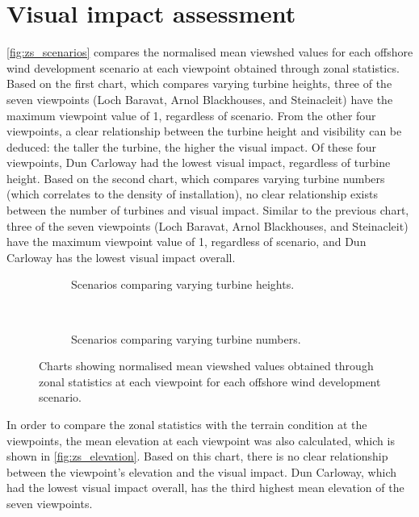 \section{Visual impact assessment}

\autoref{fig:zs_scenarios} compares the normalised mean viewshed values for
each offshore wind development scenario at each viewpoint obtained through
zonal statistics. Based on the first chart, which compares varying turbine
heights, three of the seven viewpoints (Loch Baravat, Arnol Blackhouses, and
Steinacleit) have the maximum viewpoint value of 1, regardless of scenario.
From the other four viewpoints, a clear relationship between the turbine height
and visibility can be deduced: the taller the turbine, the higher the visual
impact. Of these four viewpoints, Dun Carloway had the lowest visual impact,
regardless of turbine height. Based on the second chart, which compares varying
turbine numbers (which correlates to the density of installation), no clear
relationship exists between the number of turbines and visual impact. Similar
to the previous chart, three of the seven viewpoints (Loch Baravat, Arnol
Blackhouses, and Steinacleit) have the maximum viewpoint value of 1, regardless
of scenario, and Dun Carloway has the lowest visual impact overall.

\begin{figure}
  \centering
  \begin{subfigure}[t]{.9\textwidth}
    \caption*{Scenarios comparing varying turbine heights.}
  \end{subfigure}
  \\[.2cm]
  \begin{subfigure}[t]{.9\textwidth}
    \caption*{Scenarios comparing varying turbine numbers.}
  \end{subfigure}
  \caption{Charts showing normalised mean viewshed values obtained through zonal
  statistics at each viewpoint for each offshore wind development scenario.
  \label{fig:zs_scenarios}}
\end{figure}

In order to compare the zonal statistics with the terrain condition at the
viewpoints, the mean elevation at each viewpoint was also calculated, which is
shown in \autoref{fig:zs_elevation}. Based on this chart, there is no clear
relationship between the viewpoint's elevation and the visual impact. Dun
Carloway, which had the lowest visual impact overall, has the third highest
mean elevation of the seven viewpoints.

